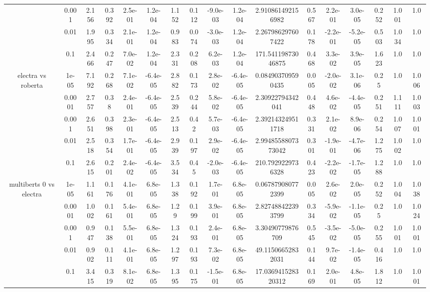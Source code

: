 \begin{tabular}{|c|c|c|c|c|c|c|c|c|c|c|c|c|c|c|c|c|}
 & 0.001 & 2.156 & 0.392 & 2.5e-01 & 1.2e-04 & 1.152 & 0.112 & -9.0e-03 & 1.2e-04 & 2.910861492156982 & 0.567 & 2.2e-01 & 3.0e-05 & 0.252 & 1.001 & 1.0 \\
 & 0.01 & 1.995 & 0.334 & 2.1e-01 & 1.2e-04 & 0.983 & 0.074 & -3.0e-03 & 1.2e-04 & 2.267986297607422 & 0.178 & -2.2e-01 & -5.2e-05 & 0.503 & 1.034 & 1.0 \\
 & 0.1 & 2.466 & 0.247 & 7.0e-02 & 1.2e-04 & 2.331 & 0.208 & 6.2e-03 & 1.2e-04 & 171.54119873046875 & 0.468 & 3.3e-02 & 3.9e-05 & 1.623 & 1.0 & 1.0 \\
\hline
\multirow{5}{*}{electra  vs roberta } & 1e-05 & 7.192 & 0.268 & 7.1e-02 & -6.4e-05 & 2.882 & 0.173 & 2.8e-02 & -6.4e-05 & 0.084903709590435 & 0.005 & -2.0e-02 & 3.1e-06 & 0.25 & 1.0 & 1.006 \\
 & 0.0001 & 2.757 & 0.38 & 2.4e-01 & -6.4e-05 & 2.539 & 0.244 & 5.8e-02 & -6.4e-05 & 2.30922794342041 & 0.448 & 4.6e-02 & -4.4e-05 & 0.251 & 1.111 & 1.003 \\
 & 0.001 & 2.651 & 0.398 & 2.3e-01 & -6.4e-05 & 2.513 & 0.42 & 5.7e-03 & -6.4e-05 & 2.392143249511718 & 0.331 & 2.1e-02 & 8.9e-06 & 0.254 & 1.007 & 1.001 \\
 & 0.01 & 2.518 & 0.354 & 1.7e-01 & -6.4e-05 & 2.939 & 0.197 & 2.9e-02 & -6.4e-05 & 2.9948558807373042 & 0.301 & -1.9e-01 & -4.7e-06 & 1.275 & 1.002 & 1.0 \\
 & 0.1 & 2.615 & 0.201 & 2.4e-02 & -6.4e-05 & 3.534 & 0.45 & -2.0e-03 & -6.4e-05 & 210.7929229736328 & 0.423 & -2.2e-02 & -1.7e-05 & 1.288 & 1.0 & 1.0 \\
\hline
\multirow{5}{*}{multiberts 0 vs electra } & 1e-05 & 1.161 & 0.176 & 4.1e-01 & 6.8e-05 & 1.338 & 0.192 & 1.7e-01 & 6.8e-05 & 0.067879080772399 & 0.005 & 2.6e-02 & 2.0e-05 & 0.252 & 1.004 & 1.038 \\
 & 0.0001 & 1.002 & 0.161 & 5.4e-01 & 6.8e-05 & 1.29 & 0.199 & 3.9e-01 & 6.8e-05 & 2.827488422393799 & 0.334 & -5.9e-02 & -1.1e-05 & 0.25 & 1.0 & 1.024 \\
 & 0.001 & 0.947 & 0.138 & 5.5e-01 & 6.8e-05 & 1.324 & 0.193 & 2.4e-01 & 6.8e-05 & 3.30490779876709 & 0.545 & -3.5e-02 & -5.0e-05 & 0.255 & 1.001 & 1.001 \\
 & 0.01 & 0.902 & 0.111 & 4.1e-01 & 6.8e-05 & 1.297 & 0.193 & 7.3e-02 & 6.8e-05 & 49.11506652832031 & 0.144 & 9.7e-02 & -1.4e-05 & 0.416 & 1.0 & 1.0 \\
 & 0.1 & 3.415 & 0.319 & 8.1e-02 & 6.8e-05 & 1.395 & 0.175 & -1.5e-01 & 6.8e-05 & 17.036941528320312 & 0.169 & 2.0e-01 & 4.8e-05 & 1.812 & 1.0 & 1.001 \\

\end{tabular}
